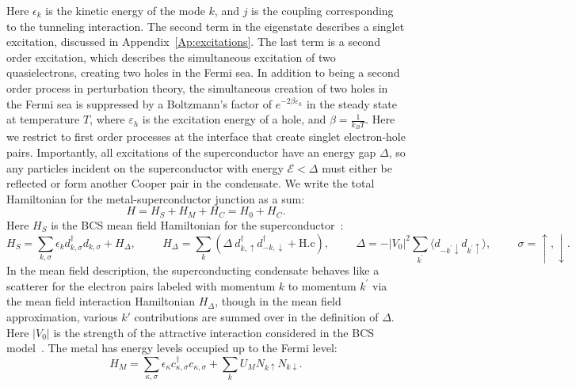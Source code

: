 \documentclass[10pt,letterpaper,aps,onecolumn,superscriptaddress,floatfix,notitlepage]{revtex4-1}
\begin{document}
	Here $\epsilon_{k}$ is the kinetic energy of the mode $k$, and $j$ is the coupling corresponding to the tunneling interaction.	The second term in the eigenstate describes a singlet excitation, discussed in Appendix~\ref{Ap:excitations}. The last term is a second order excitation, which describes the simultaneous excitation of two quasielectrons, creating two holes in the Fermi sea. In addition to being a second order process in perturbation theory, the simultaneous creation of two holes in the Fermi sea is suppressed by a Boltzmann's factor of $e^{-2\beta\varepsilon_{h}}$ in the steady state at temperature $T$, where $\varepsilon_{h}$ is the excitation energy of a hole, and $\beta = \frac{1}{k_{B}T}$. Here we restrict to first order processes at the interface that create singlet electron-hole pairs. Importantly, all excitations of the superconductor have an energy gap $\Delta$, so any particles incident on the superconductor with energy $\mathcal{E}<\Delta$ must either be reflected or form another Cooper pair in the condensate. We write the total Hamiltonian  for the metal-superconductor junction as a sum:
	\begin{equation}
	H = H_{S}+H_{M}+H_{C} = H_{0}+H_{C}.
	\end{equation}	    
	Here $H_{S}$ is the BCS mean field Hamiltonian for the superconductor~\cite{BCS}:
	\begin{equation}\label{hs} H_{S}=\sum\limits_{k,\sigma} \epsilon_{k}d_{k,\sigma}^{\dagger}d_{k,\sigma}+H_{\Delta},\hspace{1cm}H_{\Delta}=\sum\limits_{k}(\Delta ~d_{k,\uparrow}^{\dagger}d_{-k,\downarrow}^{\dagger}+\text{H.c}),\hspace{1cm}\Delta = -|V_{0}|^{2}\sum\limits_{k^{'}}\langle d_{-k^{'}\downarrow}d_{k^{'}\uparrow}\rangle, \hspace{1cm}\sigma=\uparrow,\downarrow.\end{equation}
	In the mean field description, the superconducting condensate behaves like a scatterer for the electron pairs labeled with momentum $k$ to momentum $k^{'}$ via the mean field interaction Hamiltonian $H_{\Delta}$, though in the mean field approximation, various $k'$ contributions are summed over in the definition of $\Delta$. Here $|V_{0}|$ is the strength of the attractive interaction considered in the BCS model~\cite{annett2004superconductivity}. The metal has energy levels occupied up to the Fermi level: 
	\begin{equation}
	H_{M} = \sum\limits_{\kappa, \sigma}\epsilon_{\kappa}c_{\kappa,\sigma}^{\dagger}c_{\kappa,\sigma}+\sum\limits_{k}U_{M}N_{k\uparrow}N_{k\downarrow}.
	\end{equation}
\end{document}
